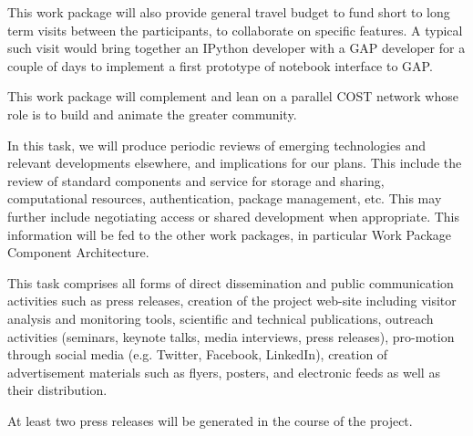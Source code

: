 \begin{workpackage}
\begin{wpdescription}
  This work package will also provide general travel budget to fund
  short to long term visits between the participants, to collaborate
  on specific features. A typical such visit would bring together an
  IPython developer with a GAP developer for a couple of days to
  implement a first prototype of notebook interface to GAP.

  This work package will complement and lean on a parallel COST
  network whose role is to build and animate the greater community.
\end{wpdescription}

\begin{tasklist}
\begin{task}[title=Reviewing emerging technologies, id=tech-review]
  In this task, we will produce periodic reviews of emerging
  technologies and relevant developments elsewhere, and implications
  for our plans. This include the review of standard components and
  service for storage and sharing, computational resources,
  authentication, package management, etc. This may further include
  negotiating access or shared development when appropriate. This
  information will be fed to the other work packages, in particular
  Work Package~ Component Architecture.
\end{task}

\begin{task}[title=Dissemination and Communication activities, id=dissemination-communication]


  This task comprises all forms of direct dissemination and public
  communication activities such as press releases, creation of the
  project web-site including visitor analysis and monitoring tools,
  scientific and technical publications, outreach activities
  (seminars, keynote talks, media interviews, press releases),
  pro-motion through social media (e.g. Twitter, Facebook, LinkedIn),
  creation of advertisement materials such as flyers, posters, and
  electronic feeds as well as their distribution.


  At least two press releases will be generated in the course of the
  project.

\end{task}


\end{tasklist}
\end{workpackage}
